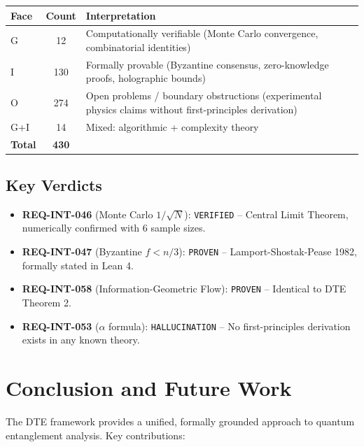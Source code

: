 \documentclass[11pt,a4paper]{article}
\theoremstyle{definition}
\begin{document}
\begin{table}[h]
\centering
\begin{tabular}{lcp{8cm}}
\toprule
\textbf{Face} & \textbf{Count} & \textbf{Interpretation} \\
\midrule
G & 12 & Computationally verifiable (Monte Carlo convergence, combinatorial identities) \\
I & 130 & Formally provable (Byzantine consensus, zero-knowledge proofs, holographic bounds) \\
O & 274 & Open problems / boundary obstructions (experimental physics claims without first-principles derivation) \\
G+I & 14 & Mixed: algorithmic + complexity theory \\
\midrule
\textbf{Total} & \textbf{430} & \\
\bottomrule
\end{tabular}
\end{table}

\subsection{Key Verdicts}

\begin{itemize}
    \item \textbf{REQ-INT-046} (Monte Carlo $1/\sqrt{N}$): \texttt{VERIFIED} -- Central Limit Theorem, numerically confirmed with 6 sample sizes.
    \item \textbf{REQ-INT-047} (Byzantine $f < n/3$): \texttt{PROVEN} -- Lamport-Shostak-Pease 1982, formally stated in Lean 4.
    \item \textbf{REQ-INT-058} (Information-Geometric Flow): \texttt{PROVEN} -- Identical to DTE Theorem 2.
    \item \textbf{REQ-INT-053} ($\alpha$ formula): \texttt{HALLUCINATION} -- No first-principles derivation exists in any known theory.
\end{itemize}

\section{Conclusion and Future Work}

The DTE framework provides a unified, formally grounded approach to quantum entanglement analysis. Key contributions:
\end{document}
